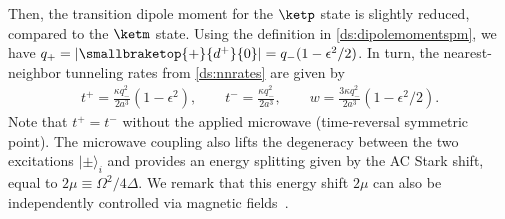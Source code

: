 Then, the transition dipole moment for the $\ketp$ state is slightly reduced, compared to the $\ketm$ state. Using the definition in \cref{ds:dipolemomentspm}, we have $q_+ = |\smallbraketop{+}{d^+}{0}|= q_- (1-\epsilon^2/2)$. In turn, the nearest-neighbor tunneling rates from \cref{ds:nnrates} are given by
\begin{align}
    t^+ = \frac{\kappa q_{-}^2}{2a^3} (1 - \epsilon^2),\qquad
    t^- = \frac{\kappa q_{-}^2}{2a^3},\qquad
    w = \frac{3 \kappa q_{-}^2}{2a^3} (1-\epsilon^2/2).
\end{align}
Note that $t^{+} = t^{-}$ without the applied microwave (time-reversal symmetric point).
The microwave coupling also lifts the degeneracy between the two excitations $|\pm\rangle_{i}$ and provides an energy splitting given by the AC Stark shift, equal to $2\mu \equiv \Omega^2/4\Delta$.
We remark that this energy shift $2\mu$ can also be independently controlled via magnetic fields~\cite{Ospelkaus2010,Yan2013}.

